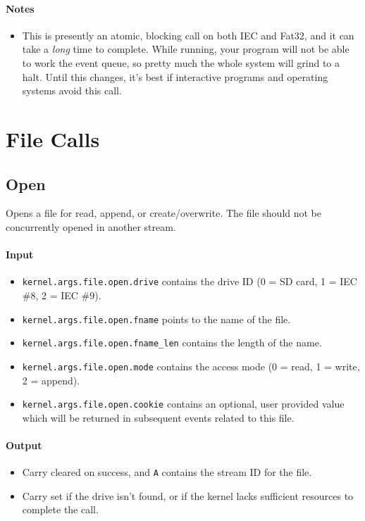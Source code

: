 \paragraph{Notes}
\begin{itemize}
\item This is presently an atomic, blocking call on both IEC and Fat32, and it can take a {\em long} time to complete.  While running, your program will not be able to work the event queue, so pretty much the whole system will grind to a halt.  Until this changes, it's best if interactive programs and operating systems avoid this call.  
\end{itemize}

\section*{File Calls}

\subsection*{Open}
Opens a file for read, append, or create/overwrite.  The file should not be concurrently opened in another stream.

\paragraph{Input}
\begin{itemize}
\item \verb+kernel.args.file.open.drive+ contains the drive ID (0 = SD card, 1 = IEC \#8, 2 = IEC \#9).
\item \verb+kernel.args.file.open.fname+ points to the name of the file.
\item \verb+kernel.args.file.open.fname_len+ contains the length of the name.
\item \verb+kernel.args.file.open.mode+ contains the access mode (0 = read, 1 = write, 2 = append). 
\item \verb+kernel.args.file.open.cookie+ contains an optional, user provided value which will be returned in subsequent events related to this file.
\end{itemize}

\paragraph{Output}
\begin{itemize}
\item Carry cleared on success, and \verb+A+ contains the stream ID for the file.
\item Carry set if the drive isn't found, or if the kernel lacks sufficient resources to complete the call.
\end{itemize}

